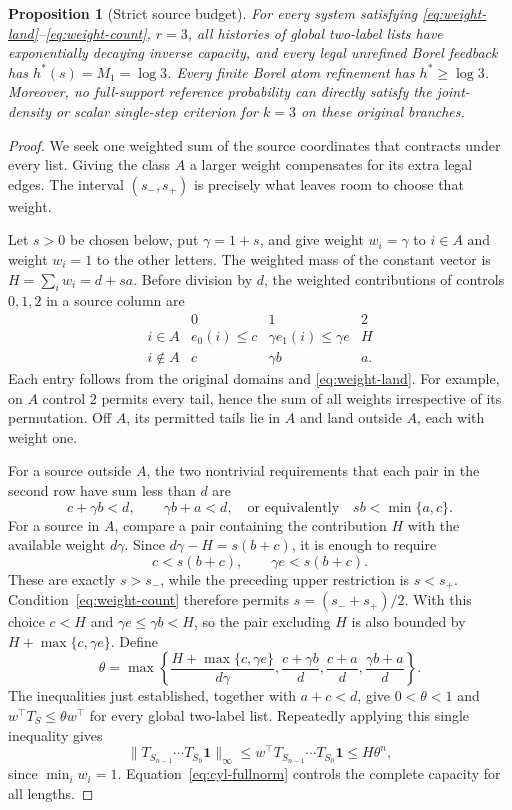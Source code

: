 \documentclass[11pt,reqno]{amsart}
\numberwithin{equation}{section}
\newtheorem{proposition}[theorem]{Proposition}
\theoremstyle{definition}
\theoremstyle{definition}
\newcommand{\one}{\mathbf 1}
\begin{document}
\begin{proposition}[Strict source budget]\label{thm:source-weight}
For every system satisfying \eqref{eq:weight-land}--\eqref{eq:weight-count},
$r=3$, all histories of global two-label lists have exponentially
decaying inverse capacity, and every legal unrefined Borel feedback
has $h^*(s)=M_1=\log3$. Every finite Borel atom refinement has
$h^*\ge\log3$. Moreover, no full-support reference probability
can directly satisfy the joint-density or scalar single-step
criterion for $k=3$ on these original branches.
\end{proposition}
\begin{proof}
We seek one weighted sum of the source coordinates that contracts
under every list. Giving the class $A$ a larger weight compensates
for its extra legal edges. The interval $(s_-,s_+)$ is precisely
what leaves room to choose that weight.

Let $s>0$ be chosen below, put $\gamma=1+s$, and give weight
$w_i=\gamma$ to $i\in A$ and weight $w_i=1$ to the other
letters. The weighted mass of the constant vector is
$H=\sum_iw_i=d+sa$.
Before division by $d$, the weighted contributions of controls
$0,1,2$ in a source column are
\[
\begin{array}{c|ccc}
 &0&1&2\\\hline
 i\in A&e_0(i)\le c&\gamma e_1(i)\le\gamma e&H\\
 i\notin A&c&\gamma b&a.
\end{array}
\]
Each entry follows from the original domains and
\eqref{eq:weight-land}. For example, on $A$ control $2$ permits
every tail, hence the sum of all weights irrespective of its
permutation. Off $A$, its permitted tails lie in $A$ and land
outside $A$, each with weight one.

For a source outside $A$, the two nontrivial requirements that
each pair in the second row have sum less than $d$ are
\[
 c+\gamma b<d,\qquad \gamma b+a<d,
 \quad\text{or equivalently}\quad sb<\min\{a,c\}.
\]
For a source in $A$, compare a pair containing the contribution
$H$ with the available weight $d\gamma$. Since
$d\gamma-H=s(b+c)$, it is enough to require
\[
 c<s(b+c),\qquad \gamma e<s(b+c).
\]
These are exactly $s>s_-$, while the preceding upper restriction
is $s<s_+$. Condition~\eqref{eq:weight-count} therefore permits
$s=(s_-+s_+)/2$. With this choice $c<H$ and
$\gamma e\le\gamma b<H$, so the pair excluding $H$ is also
bounded by $H+\max\{c,\gamma e\}$. Define
\[
 \theta=\max\left\{
 \frac{H+\max\{c,\gamma e\}}{d\gamma},
 \frac{c+\gamma b}{d},\frac{c+a}{d},\frac{\gamma b+a}{d}
 \right\}.
\]
The inequalities just established, together with $a+c<d$,
give $0<\theta<1$ and
$w^\top T_S\le\theta w^\top$ for every global two-label list.
Repeatedly applying this single inequality gives
\[
 \|T_{S_{n-1}}\cdots T_{S_0}\one\|_\infty
 \le w^\top T_{S_{n-1}}\cdots T_{S_0}\one
 \le H\theta^n,
\]
since $\min_iw_i=1$. Equation~\eqref{eq:cyl-fullnorm} controls
the complete capacity for all lengths.


\end{proof}
\end{document}
